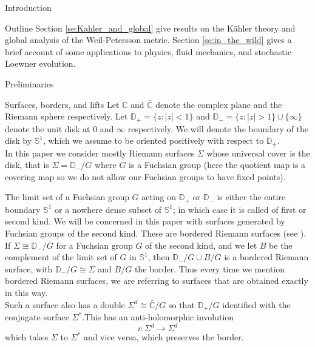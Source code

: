 \documentclass[12pt]{amsart}
\newcommand{\disk}{\ensuremath{\mathbb{D}} } %
\newcommand{\sphere}{\bar{\Bbb{C}}} %
\newcommand{\riem}{\Sigma}  %
\renewcommand{\Bbb}[1]{\ensuremath{\mathbb{#1}}}
\theoremstyle{plain}
\theoremstyle{definition}
\theoremstyle{remark}
\numberwithin{equation}{section} %
\numberwithin{figure}{section} %
\begin{document}
\begin{section}{Introduction}
\begin{subsection}{Outline}
  Section \ref{se:Kahler_and_global} give results on the K\"ahler theory and global analysis of the Weil-Petersson metric. 
  Section \ref{se:in_the_wild} gives a brief account of some applications to physics, fluid mechanics, and stochastic Loewner evolution. 

  
\end{subsection}
\end{section}
\begin{section}{Preliminaries} \label{se:preliminaries}
 
\begin{subsection}{Surfaces, borders, and lifts}
   Let $\mathbb{C}$ and $\sphere$ denote the complex plane and the Riemann sphere respectively. Let $\disk_+ = \{z : |z|<1 \}$ and $\disk_- = \{ z: |z|>1 \} \cup \{\infty \}$ denote the unit disk at $0$ and $\infty$ respectively. 
   We will denote the boundary of the disk by $\mathbb{S}^1$, which we assume to be oriented positively with respect to $\disk_+$.\\
  
  In this paper we consider mostly Riemann surfaces $\riem$ whose universal cover is the disk, that is $\riem=\disk_-/G$ where $G$ is a Fuchsian group (here the quotient map is a covering map so we do not allow our Fuchsian groups to have fixed points). 
  
  The limit set of a Fuchsian group $G$ acting on $\disk_+$ or $\disk_-$ is either the entire boundary $\mathbb{S}^1$ or a nowhere dense subset of $\mathbb{S}^1$; in which case it is called of first or second kind. We will be concerned in this paper with surfaces generated by Fuchsian groups of the second kind.  These are bordered Riemann surfaces (see \cite{Lehto,Ahlfors_Sario}). If $\riem \cong \disk_- /G$ for a Fuchsian group $G$ of the second kind, and we let $B$ be the complement of the limit set of $G$ in $\mathbb{S}^1$, then $\disk_-/G \cup B/G$ is a bordered Riemann surface, with $\disk_-/G \cong \riem$ and $B/G$ the border. Thus every time we mention bordered Riemann surfaces, we are referring to surfaces that are obtained exactly in this way.\\Such a surface also has a double $\riem^d \cong \sphere/G$ so that $\disk_+ /G$ identified with the conjugate surface $\riem^*$.This has an anti-holomorphic involution 
  \[ i: \riem^d \rightarrow \riem^d \]
  which takes $\riem$ to $\riem^*$ and vice versa, which preserves the border. 


\end{subsection}
\end{section}
\end{document}
